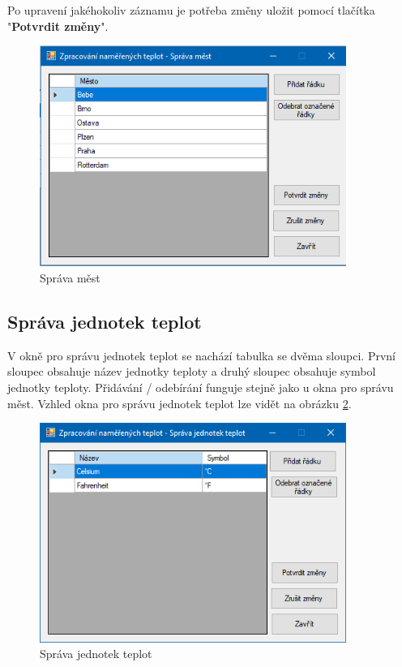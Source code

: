 \documentclass[12pt, a4paper]{article}
\begin{document}
Po upravení jakéhokoliv záznamu je potřeba změny uložit pomocí tlačítka "\textbf{Potvrdit změny}".
\begin{figure}[h!]
	\centering
	\includegraphics[width=10cm]{img/manage_cities.png}
	\caption{Správa měst}
	\label{fig:manage_cities}
\end{figure}
\newpage
\subsection{Správa jednotek teplot}
V okně pro správu jednotek teplot se nachází tabulka se dvěma sloupci. První sloupec obsahuje název jednotky teploty a druhý sloupec obsahuje symbol jednotky teploty. Přidávání / odebírání funguje stejně jako u okna pro správu měst. Vzhled okna pro správu jednotek teplot lze vidět na obrázku \ref{fig:manage_measures}.
\begin{figure}[h!]
	\centering
	\includegraphics[width=10cm]{img/manage_measures.png}
	\caption{Správa jednotek teplot}
	\label{fig:manage_measures}
\end{figure}
\end{document}
